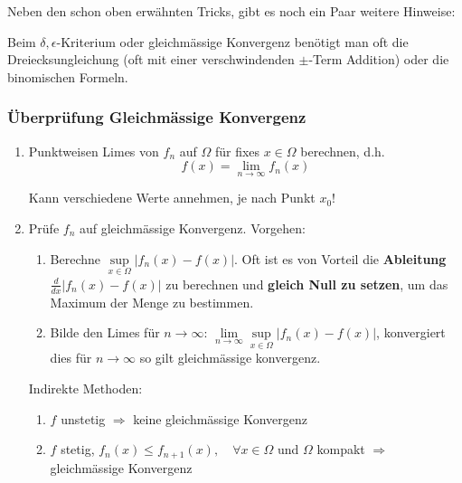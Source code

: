\begin{multicols*}{3}
    Neben den schon oben erwähnten Tricks, gibt es noch ein Paar weitere Hinweise: \medskip

    Beim $\delta,\epsilon$-Kriterium oder gleichmässige Konvergenz benötigt man oft die Dreiecksungleichung (oft mit einer verschwindenden $\pm$-Term Addition) oder die binomischen Formeln.


    \subsubsection{Überprüfung Gleichmässige Konvergenz}

    \begin{enumerate}
        \item Punktweisen Limes von $f_n$ auf $\Omega$ für fixes $x\in\Omega$ berechnen, d.h.
              $$f(x) =\lim \limits_{n\to\infty} f_n(x)$$

              Kann verschiedene Werte annehmen, je nach Punkt $x_0$!

        \item Prüfe $f_n$ auf gleichmässige Konvergenz. Vorgehen:
              \begin{enumerate}
                  \item Berechne $\sup \limits_{x\in\Omega} |f_n(x)-f(x)|$. Oft ist es von Vorteil die \textbf{Ableitung} $\frac{d}{dx} |f_n(x)-f(x)|$ zu berechnen und \textbf{gleich Null zu setzen}, um das Maximum der Menge zu bestimmen.
                  \item Bilde den Limes für $n\to\infty$: $\lim\limits_{n\to\infty}\sup\limits_{x\in\Omega}|f_n(x)-f(x)|$, konvergiert dies für $n\to \infty$ so gilt gleichmässige konvergenz.
              \end{enumerate}
              Indirekte Methoden:
              \begin{enumerate}
                  \item $ f$ unstetig $\Rightarrow$ keine gleichmässige Konvergenz
                  \item $f$ stetig, $f_n(x)\leq f_{n+1}(x),\quad\forall x \in\Omega $ und $\Omega$ kompakt $\Rightarrow$ gleichmässige Konvergenz
              \end{enumerate}
    \end{enumerate}
    \vfill\null
    \columnbreak

\end{multicols*}